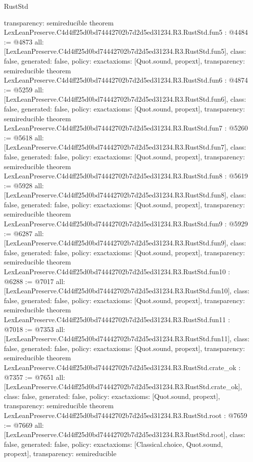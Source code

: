 \begin{lexlean}{RustStd}
\begin{coremodule}
{  transparency: semireducible
}
theorem LexLeanPreserve.C4d4ff25d0bd74442702b7d2d5ed31234.R3.RustStd.fun5 : @4484 := @4873 {
  all: [LexLeanPreserve.C4d4ff25d0bd74442702b7d2d5ed31234.R3.RustStd.fun5],
  class: false,
  generated: false,
  policy: exact{axioms: [Quot.sound, propext]},
  transparency: semireducible
}
theorem LexLeanPreserve.C4d4ff25d0bd74442702b7d2d5ed31234.R3.RustStd.fun6 : @4874 := @5259 {
  all: [LexLeanPreserve.C4d4ff25d0bd74442702b7d2d5ed31234.R3.RustStd.fun6],
  class: false,
  generated: false,
  policy: exact{axioms: [Quot.sound, propext]},
  transparency: semireducible
}
theorem LexLeanPreserve.C4d4ff25d0bd74442702b7d2d5ed31234.R3.RustStd.fun7 : @5260 := @5618 {
  all: [LexLeanPreserve.C4d4ff25d0bd74442702b7d2d5ed31234.R3.RustStd.fun7],
  class: false,
  generated: false,
  policy: exact{axioms: [Quot.sound, propext]},
  transparency: semireducible
}
theorem LexLeanPreserve.C4d4ff25d0bd74442702b7d2d5ed31234.R3.RustStd.fun8 : @5619 := @5928 {
  all: [LexLeanPreserve.C4d4ff25d0bd74442702b7d2d5ed31234.R3.RustStd.fun8],
  class: false,
  generated: false,
  policy: exact{axioms: [Quot.sound, propext]},
  transparency: semireducible
}
theorem LexLeanPreserve.C4d4ff25d0bd74442702b7d2d5ed31234.R3.RustStd.fun9 : @5929 := @6287 {
  all: [LexLeanPreserve.C4d4ff25d0bd74442702b7d2d5ed31234.R3.RustStd.fun9],
  class: false,
  generated: false,
  policy: exact{axioms: [Quot.sound, propext]},
  transparency: semireducible
}
theorem LexLeanPreserve.C4d4ff25d0bd74442702b7d2d5ed31234.R3.RustStd.fun10 : @6288 := @7017 {
  all: [LexLeanPreserve.C4d4ff25d0bd74442702b7d2d5ed31234.R3.RustStd.fun10],
  class: false,
  generated: false,
  policy: exact{axioms: [Quot.sound, propext]},
  transparency: semireducible
}
theorem LexLeanPreserve.C4d4ff25d0bd74442702b7d2d5ed31234.R3.RustStd.fun11 : @7018 := @7353 {
  all: [LexLeanPreserve.C4d4ff25d0bd74442702b7d2d5ed31234.R3.RustStd.fun11],
  class: false,
  generated: false,
  policy: exact{axioms: [Quot.sound, propext]},
  transparency: semireducible
}
theorem LexLeanPreserve.C4d4ff25d0bd74442702b7d2d5ed31234.R3.RustStd.crate_ok : @7357 := @7651 {
  all: [LexLeanPreserve.C4d4ff25d0bd74442702b7d2d5ed31234.R3.RustStd.crate_ok],
  class: false,
  generated: false,
  policy: exact{axioms: [Quot.sound, propext]},
  transparency: semireducible
}
theorem LexLeanPreserve.C4d4ff25d0bd74442702b7d2d5ed31234.R3.RustStd.root : @7659 := @7669 {
  all: [LexLeanPreserve.C4d4ff25d0bd74442702b7d2d5ed31234.R3.RustStd.root],
  class: false,
  generated: false,
  policy: exact{axioms: [Classical.choice, Quot.sound, propext]},
  transparency: semireducible
}


\end{coremodule}
\end{lexlean}
